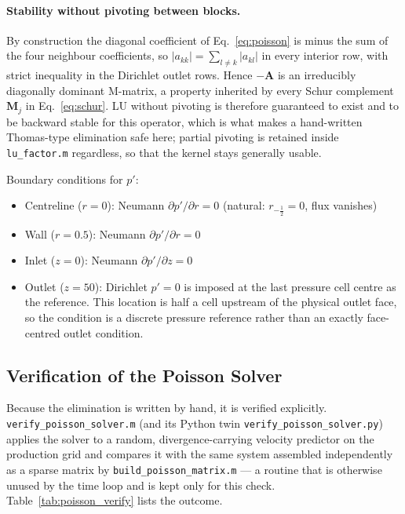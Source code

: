 \documentclass[12pt,a4paper]{article}
\begin{document}
\paragraph{Stability without pivoting between blocks.}
By construction the diagonal coefficient of Eq.~\eqref{eq:poisson} is minus the sum of the four neighbour coefficients, so $|a_{kk}| = \sum_{l \neq k} |a_{kl}|$ in every interior row, with strict inequality in the Dirichlet outlet rows.
Hence $-\mathbf{A}$ is an irreducibly diagonally dominant M-matrix, a property inherited by every Schur complement $\mathbf{M}_j$ in Eq.~\eqref{eq:schur}.
LU without pivoting is therefore guaranteed to exist and to be backward stable for this operator, which is what makes a hand-written Thomas-type elimination safe here; partial pivoting is retained inside \texttt{lu\_factor.m} regardless, so that the kernel stays generally usable.

Boundary conditions for $p'$:
\begin{itemize}
    \item Centreline ($r=0$): Neumann $\partial p'/\partial r = 0$ (natural: $r_{-\frac{1}{2}} = 0$, flux vanishes)
    \item Wall ($r=0.5$): Neumann $\partial p'/\partial r = 0$
    \item Inlet ($z=0$): Neumann $\partial p'/\partial z = 0$
    \item Outlet ($z=50$): Dirichlet $p' = 0$ is imposed at the last pressure cell centre as the reference. This location is half a cell upstream of the physical outlet face, so the condition is a discrete pressure reference rather than an exactly face-centred outlet condition.
\end{itemize}

\subsection{Verification of the Poisson Solver}
\label{sec:poisson_verification}

Because the elimination is written by hand, it is verified explicitly.
\texttt{verify\_poisson\_solver.m} (and its Python twin \texttt{verify\_poisson\_solver.py}) applies the solver to a random, divergence-carrying velocity predictor on the production grid and compares it with the same system assembled independently as a sparse matrix by \texttt{build\_poisson\_matrix.m} --- a routine that is otherwise unused by the time loop and is kept only for this check.
Table~\ref{tab:poisson_verify} lists the outcome.
\end{document}
